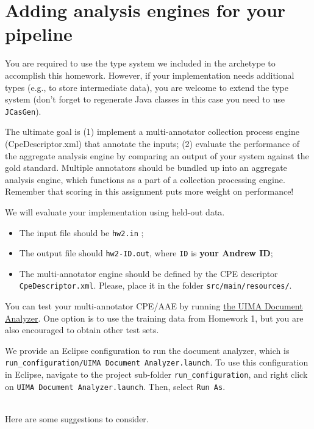 
\section{Adding analysis engines for your pipeline}

You are required to use the type system we included in the archetype to
accomplish this homework. However, if your implementation needs additional 
types (e.g., to store intermediate data), 
you are welcome to extend the type system (don't forget to regenerate Java classes in this case
you need to use \texttt{JCasGen}).

The ultimate goal is (1) implement a multi-annotator collection process engine (CpeDescriptor.xml) 
that annotate the inputs;
(2) evaluate the performance of the aggregate analysis engine by
comparing an output of your system against the gold standard.
Multiple annotators should be bundled up into an aggregate analysis engine,
which functions as a part of a collection processing engine.
Remember that scoring in this assignment puts more weight on performance!

We will evaluate your implementation using held-out data.
\begin{itemize}
\item The input file should be \texttt{hw2.in} ;
\item The output file should  \texttt{hw2-ID.out},
where \texttt{ID} is \textbf{your Andrew ID};
\item The multi-annotator engine should be defined by 
the CPE descriptor \texttt{CpeDescriptor.xml}.
Please, place it in the folder   \texttt{src/main/resources/}.
\end{itemize}

You can test your multi-annotator CPE/AAE by running 
\href{http://uima.apache.org/d/uimaj-2.4.0/tools.html#ugr.tools.doc_analyzer}{the UIMA Document Analyzer}.
One option is to use the training data from Homework 1, but you are also encouraged
to obtain other test sets.

We provide an Eclipse configuration to run the document analyzer,
which is \newline\texttt{run\_configuration/UIMA Document Analyzer.launch}. 
To use this configuration in Eclipse, navigate to the project sub-folder \texttt{run\_configuration},
and right click on \texttt{UIMA Document Analyzer.launch}.
Then, select \texttt{Run As}.


~\\
Here are some suggestions to consider.


